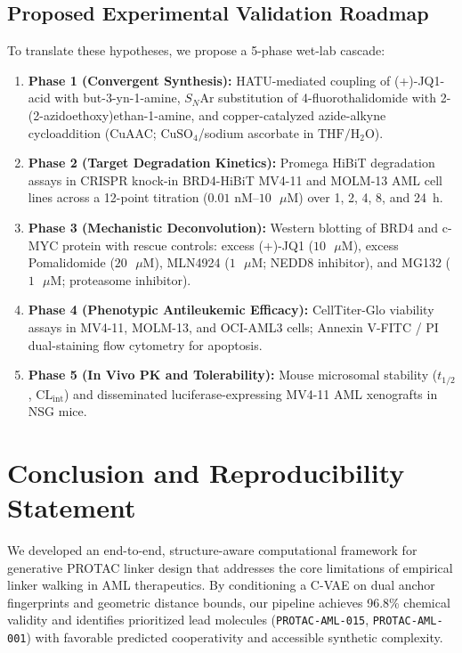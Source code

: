 \documentclass[conference]{IEEEtran}
\begin{document}
\subsection{Proposed Experimental Validation Roadmap}
To translate these hypotheses, we propose a 5-phase wet-lab cascade:
\begin{enumerate}
    \item \textbf{Phase 1 (Convergent Synthesis):} HATU-mediated coupling of (+)-JQ1-acid with but-3-yn-1-amine, $S_N\text{Ar}$ substitution of 4-fluorothalidomide with 2-(2-azidoethoxy)ethan-1-amine, and copper-catalyzed azide-alkyne cycloaddition (CuAAC; $\text{CuSO}_4$/sodium ascorbate in $\text{THF}/\text{H}_2\text{O}$).
    \item \textbf{Phase 2 (Target Degradation Kinetics):} Promega HiBiT degradation assays in CRISPR knock-in BRD4-HiBiT MV4-11 and MOLM-13 AML cell lines across a 12-point titration ($0.01\text{ nM}\text{--}10\text{ }\mu\text{M}$) over 1, 2, 4, 8, and 24~h.
    \item \textbf{Phase 3 (Mechanistic Deconvolution):} Western blotting of BRD4 and c-MYC protein with rescue controls: excess (+)-JQ1 ($10\text{ }\mu\text{M}$), excess Pomalidomide ($20\text{ }\mu\text{M}$), MLN4924 ($1\text{ }\mu\text{M}$; NEDD8 inhibitor), and MG132 ($1\text{ }\mu\text{M}$; proteasome inhibitor).
    \item \textbf{Phase 4 (Phenotypic Antileukemic Efficacy):} CellTiter-Glo viability assays in MV4-11, MOLM-13, and OCI-AML3 cells; Annexin V-FITC / PI dual-staining flow cytometry for apoptosis.
    \item \textbf{Phase 5 (In Vivo PK and Tolerability):} Mouse microsomal stability ($t_{1/2}$, $\text{CL}_{\text{int}}$) and disseminated luciferase-expressing MV4-11 AML xenografts in NSG mice.
\end{enumerate}

\section{Conclusion and Reproducibility Statement}
We developed an end-to-end, structure-aware computational framework for generative PROTAC linker design that addresses the core limitations of empirical linker walking in AML therapeutics. By conditioning a C-VAE on dual anchor fingerprints and geometric distance bounds, our pipeline achieves 96.8\% chemical validity and identifies prioritized lead molecules (\texttt{PROTAC-AML-015}, \texttt{PROTAC-AML-001}) with favorable predicted cooperativity and accessible synthetic complexity.
\end{document}
